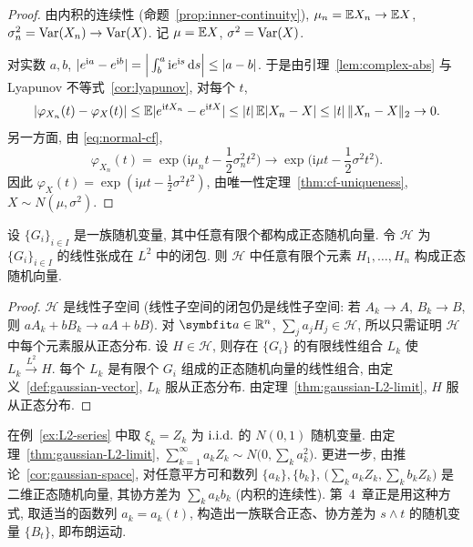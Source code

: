 \begin{proof}
由内积的连续性 (命题~\ref{prop:inner-continuity}), $\mu_n=\mathbb{E} X_n\to\mathbb{E} X$, $\sigma_n^2=\operatorname{Var}(X_n)\to\operatorname{Var}(X)$. 记 $\mu=\mathbb{E} X$, $\sigma^2=\operatorname{Var}(X)$.

对实数 $a,b$, $\lvert e^{\mathrm{i}a}-e^{\mathrm{i}b}\rvert=\Big|\int_b^a\mathrm{i}e^{\mathrm{i}s}\mathop{}\!\mathrm{d} s\Big|\le\lvert a-b\rvert$. 于是由引理~\ref{lem:complex-abs} 与 Lyapunov 不等式~\ref{cor:lyapunov}, 对每个 $t$,
\[
\lvert\varphi_{X_n}(t)-\varphi_X(t)\rvert\le\mathbb{E}\lvert e^{\mathrm{i}tX_n}-e^{\mathrm{i}tX}\rvert\le\lvert t\rvert\,\mathbb{E}\lvert X_n-X\rvert\le\lvert t\rvert\,\lVert X_n-X\rVert_2\to0.
\]
另一方面, 由 \eqref{eq:normal-cf},
\[
\varphi_{X_n}(t)=\exp\Big(\mathrm{i}\mu_nt-\frac{1}{2}\sigma_n^2t^2\Big)\to\exp\Big(\mathrm{i}\mu t-\frac{1}{2}\sigma^2t^2\Big).
\]
因此 $\varphi_X(t)=\exp(\mathrm{i}\mu t-\frac{1}{2}\sigma^2t^2)$, 由唯一性定理~\ref{thm:cf-uniqueness}, $X\sim N(\mu,\sigma^2)$.
\end{proof}

\begin{corollary}[高斯族的闭线性张成]\label{cor:gaussian-space}
设 $\{G_i\}_{i\in I}$ 是一族随机变量, 其中任意有限个都构成正态随机向量. 令 $\mathcal{H}$ 为 $\{G_i\}_{i\in I}$ 的线性张成在 $L^2$ 中的闭包. 则 $\mathcal{H}$ 中任意有限个元素 $H_1,\dots,H_n$ 构成正态随机向量.
\end{corollary}

\begin{proof}
$\mathcal{H}$ 是线性子空间 (线性子空间的闭包仍是线性子空间: 若 $A_k\to A$, $B_k\to B$, 则 $aA_k+bB_k\to aA+bB$). 对 $\rvec{a}\in\R^n$, $\sum_ja_jH_j\in\mathcal{H}$, 所以只需证明 $\mathcal{H}$ 中每个元素服从正态分布. 设 $H\in\mathcal{H}$, 则存在 $\{G_i\}$ 的有限线性组合 $L_k$ 使 $L_k\xrightarrow{L^2}H$. 每个 $L_k$ 是有限个 $G_i$ 组成的正态随机向量的线性组合, 由定义~\ref{def:gaussian-vector}, $L_k$ 服从正态分布. 由定理~\ref{thm:gaussian-L2-limit}, $H$ 服从正态分布.
\end{proof}

\begin{example}
在例~\ref{ex:L2-series} 中取 $\xi_k=Z_k$ 为 $\text{i.i.d.}$ 的 $N(0,1)$ 随机变量. 由定理~\ref{thm:gaussian-L2-limit}, $\sum_{k=1}^\infty a_kZ_k\sim N\big(0,\sum_ka_k^2\big)$. 更进一步, 由推论~\ref{cor:gaussian-space}, 对任意平方可和数列 $\{a_k\},\{b_k\}$, $\big(\sum_ka_kZ_k,\sum_kb_kZ_k\big)$ 是二维正态随机向量, 其协方差为 $\sum_ka_kb_k$ (内积的连续性). 第~4~章正是用这种方式, 取适当的函数列 $a_k=a_k(t)$, 构造出一族联合正态、协方差为 $s\wedge t$ 的随机变量 $\{B_t\}$, 即布朗运动.
\end{example}


